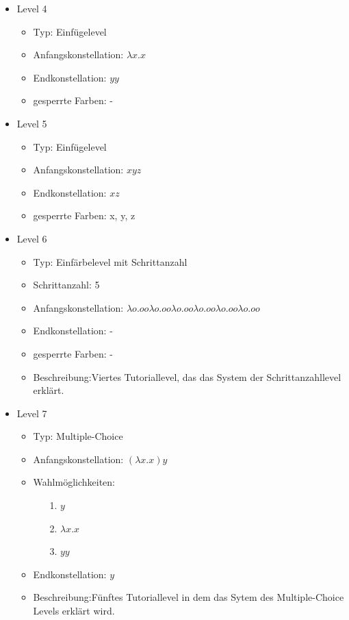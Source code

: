 \begin{itemize}
	\item{Level 4} 
		\begin{itemize}
			\item{Typ:} Einfügelevel
			\item{Anfangskonstellation:} \(\lambda x . x \)    
			\item{Endkonstellation:} \(y y\)
			\item{gesperrte Farben:} - 
		\end{itemize}

	\item{Level 5} 
		\begin{itemize}
			\item{Typ:} Einfügelevel
			\item{Anfangskonstellation:} \(x y z\)    
			\item{Endkonstellation:}  \(x z\)
			\item{gesperrte Farben:} x, y, z
		\end{itemize}

	\item{Level 6} 
		\begin{itemize}
			\item{Typ:} Einfärbelevel mit Schrittanzahl
			\item{Schrittanzahl:} 5
			\item{Anfangskonstellation:} \(\lambda o . o o  \lambda o . o o \lambda o . o o  \lambda o . o o \lambda o . o o  \lambda o . o o\) 
			\item{Endkonstellation:}  -
			\item{gesperrte Farben:} -
			\item{Beschreibung:}Viertes Tutoriallevel, das das System der Schrittanzahllevel erklärt.
		\end{itemize}

	\item{Level 7} 
		\begin{itemize}
			\item{Typ:} Multiple-Choice 
			\item{Anfangskonstellation:} \((\lambda x . x ) y\)    
			\item{Wahlmöglichkeiten:}  
				\begin{itemize}
					\item[1.] \(y\)
					\item[2.] \(\lambda x . x \) 
					\item[3.] \(y y\)
				\end{itemize}
			\item{Endkonstellation:} \(y\)
			\item{Beschreibung:}Fünftes Tutoriallevel in dem das Sytem des Multiple-Choice Levels erklärt wird.
		\end{itemize}


\end{itemize}

